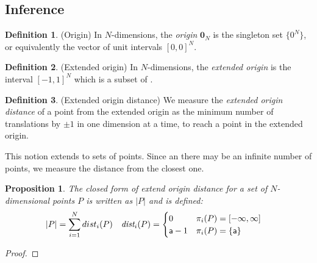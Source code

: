 \documentclass[acmlarge,review]{acmart}
\theoremstyle{definition}
\newtheorem{defn}{Definition}
\theoremstyle{plain}
\newtheorem{prop}{Proposition}
\theoremstyle{remark}
\begin{document}
\subsection{Inference}

\begin{defn}{(Origin)}
In $N$-dimensions, the \emph{origin} $\mathbf{0}_N$ is the singleton set
$\{0^N\}$, or equivalently the vector of unit intervals $[0, 0]^N$.
\end{defn}

\begin{defn}{(Extended origin)}
In $N$-dimensions, the \emph{extended origin} is the
interval $[-1, 1]^N$ which is a subset of . 
\end{defn}

\begin{defn}{(Extended origin distance)}
  We measure the \emph{extended origin distance} of a point from the
  extended origin as the minimum number of translations by $\pm 1$ in one
  dimension at a time, to reach a point in the extended
  origin. 

This notion extends to sets of points. Since an 
   there may be an infinite number of points, we measure the
  distance from the closest one.
\end{defn}
%
\begin{prop}{}
  The closed form of extend origin distance for a set of $N$-dimensional
  points $P$ is written as $|P|$ and is defined:
%
  \begin{align*}
|P| & = \sum_{i=1}^{N} dist_i(P)
 & 
    \textit{dist}_i(P) & = \begin{cases}
      0 & \pi_i(P) = \textnormal{$\lbrack-\infty,\infty\rbrack^{}$} \\
      \mathsf{a} - 1 & \pi_i(P) = \{\mathsf{a}\} \\
    \end{cases}
  \end{align*}
\end{prop}
%
\begin{proof}
\end{proof}
\end{document}
